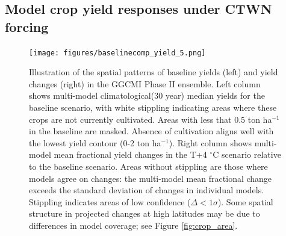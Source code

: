 \documentclass[gmd, manuscript]{copernicus} %
\begin{document}
\subsection{Model crop yield responses under CTWN forcing}
\begin{figure}[ht]
\centering
  \texttt{[image: figures/baselinecomp\_yield\_5.png]} 
  \caption{
  Illustration of the spatial patterns of baseline yields (left) and yield changes (right) in the GGCMI Phase II ensemble. 
  Left column shows multi-model climatological(30 year) median yields for the baseline scenario, with white stippling indicating areas where these crops are not currently cultivated. 
  Areas with less that 0.5 ton ha$^{-1}$ in the baseline are masked.
  Absence of cultivation aligns well with the lowest yield contour (0-2 ton ha$^{-1}$). 
  Right column shows multi-model mean fractional yield changes in the T+4 $^{\circ}$C scenario relative to the baseline scenario. 
  Areas without stippling are those where models agree on changes: the multi-model mean fractional change exceeds the standard deviation of changes in individual models. 
  Stippling indicates areas of low confidence ($\Delta < 1 \sigma$). 
  Some spatial structure in projected changes at high latitudes may be due to differences in model coverage; see Figure \ref{fig:crop_area}.
  }
  \label{fig:maizesoybaseline}
\end{figure}
\end{document}
